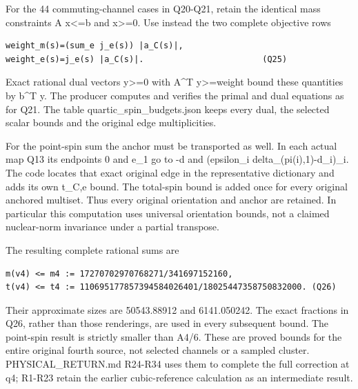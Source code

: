 \documentclass[11pt,a4paper]{article}
\renewcommand{\[}{\begingroup\small\originaldisplaystart}
\renewcommand{\]}{\originaldisplayend\endgroup}
\begin{document}
For the 44 commuting-channel cases in Q20-Q21, retain the identical mass
constraints A x\textless=b and x\textgreater=0. Use instead the two
complete objective rows

\begin{verbatim}
weight_m(s)=(sum_e j_e(s)) |a_C(s)|,
weight_e(s)=j_e(s) |a_C(s)|.                        (Q25)
\end{verbatim}

Exact rational dual vectors y\textgreater=0 with A\^{}T
y\textgreater=weight bound these quantities by b\^{}T y. The producer
computes and verifies the primal and dual equations as for Q21. The
table
{\ttfamily q\allowbreak{}u\allowbreak{}a\allowbreak{}r\allowbreak{}t\allowbreak{}i\allowbreak{}c\allowbreak{}\_\allowbreak{}s\allowbreak{}p\allowbreak{}i\allowbreak{}n\allowbreak{}\_\allowbreak{}b\allowbreak{}u\allowbreak{}d\allowbreak{}g\allowbreak{}e\allowbreak{}t\allowbreak{}s\allowbreak{}.\allowbreak{}j\allowbreak{}s\allowbreak{}o\allowbreak{}n\allowbreak{}}
keeps every dual, the selected scalar bounds and the original edge
multiplicities.

For the point-spin sum the anchor must be transported as well. In each
actual map Q13 its endpoints 0 and e\_1 go to -d and (epsilon\_i
delta\_(pi(i),1)-d\_i)\_i. The code locates that exact original edge in
the representative dictionary and adds its own t\_C,e bound. The
total-spin bound is added once for every original anchored multiset.
Thus every original orientation and anchor are retained. In particular
this computation uses universal orientation bounds, not a claimed
nuclear-norm invariance under a partial transpose.

The resulting complete rational sums are

\begin{verbatim}
m(v4) <= m4 := 17270702970768271/341697152160,
t(v4) <= t4 := 110695177857394584026401/18025447358750832000. (Q26)
\end{verbatim}

Their approximate sizes are 50543.88912 and 6141.050242. The exact
fractions in Q26, rather than those renderings, are used in every
subsequent bound. The point-spin result is strictly smaller than A4/6.
These are proved bounds for the entire original fourth source, not
selected channels or a sampled cluster.
{\ttfamily P\allowbreak{}H\allowbreak{}Y\allowbreak{}S\allowbreak{}I\allowbreak{}C\allowbreak{}A\allowbreak{}L\allowbreak{}\_\allowbreak{}R\allowbreak{}E\allowbreak{}T\allowbreak{}U\allowbreak{}R\allowbreak{}N\allowbreak{}.\allowbreak{}m\allowbreak{}d\allowbreak{}}
R24-R34 uses them to complete the full correction at q4; R1-R23 retain
the earlier cubic-reference calculation as an intermediate result.
\end{document}
